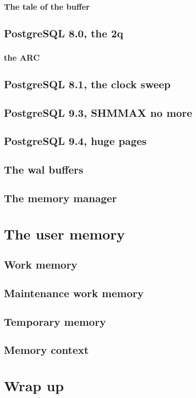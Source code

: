 \subsubsection{The tale of the buffer}

\subsection{PostgreSQL 8.0, the 2q}
\subsubsection{the ARC}

\subsection{PostgreSQL 8.1, the clock sweep}

\subsection{PostgreSQL 9.3, SHMMAX no more}

\subsection{PostgreSQL 9.4, huge pages}


\subsection{The wal buffers}

\subsection{The memory manager}
\section{The user memory}
\subsection{Work memory}
\subsection{Maintenance work memory}
\subsection{Temporary memory}


\subsection{Memory context}

\section{Wrap up}